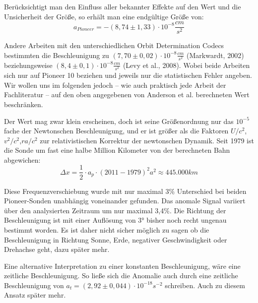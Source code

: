 Berücksichtigt man den Einfluss aller bekannter Effekte auf den Wert und die Unsicherheit der Größe,\cite{Turyshev2004} so erhält man eine endgültige Größe von:  
\begin{equation}
  a_{Pioneer} = -(8,74\pm1,33)\cdot10^{-8}\frac{cm}{s^2}
\end{equation}

Andere Arbeiten mit den  unterschiedlichen Orbit Determination Codecs bestimmten die Beschleunigung zu $(7,70
\pm0,02)\cdot10^{-8}\frac{cm}{s^2}$ (Markwardt, 2002)\cite{Markwardt2002} beziehungsweise %
$(8,4\pm0,1)\cdot10^{-8}\frac{cm}{s^2}$ (Levy et al., 2008)\cite{Levy2008}.
Wobei beide Arbeiten sich nur auf Pioneer 10 beziehen und jeweils nur die statistischen Fehler angeben.
Wir wollen uns im folgenden jedoch – wie auch praktisch jede Arbeit der Fachliteratur – auf den oben angegebenen von
Anderson et al. berechneten Wert beschränken.

Der Wert mag zwar klein erscheinen, doch ist seine Größenordnung nur das $10^{-5}$ fache der Newtonschen Beschleunigung,
und er ist größer als die Faktoren $U/c^2$,$v^2/c^2$,$r a/c^2$ zur relativistischen Korrektur der newtonschen Dynamik.
Seit 1979 ist die Sonde um fast eine halbe Million Kilometer von der berechneten Bahn abgewichen:
\begin{equation}
  \Delta x= \frac12 \cdot a_p \cdot (2011-1979)^2 a^2\approx 445.000 km
\end{equation}

Diese Frequenzverschiebung wurde mit nur maximal 3\% Unterschied bei beiden Pioneer-Sonden unabhängig voneinander
gefunden. Das anomale Signal variiert über den analysierten Zeitraum um nur maximal 3,4\%.\cite{Turyshev2004} Die Richtung der
Beschleunigung ist mit einer Auflösung von 3° bisher noch recht ungenau bestimmt worden. Es ist daher nicht sicher möglich
zu sagen ob die Beschleunigung
in Richtung Sonne, Erde, negativer Geschwindigkeit oder Drehachse geht, dazu später mehr.

Eine alternative Interpretation zu einer konstanten Beschleunigung, wäre eine zeitliche Beschleunigung.
So ließe sich die Anomalie auch durch eine zeitliche Beschleunigung von $a_t = (2,92 \pm 0,044) \cdot 10^{-18} s^{-2}$ schreiben. Auch zu diesem Ansatz später mehr.
